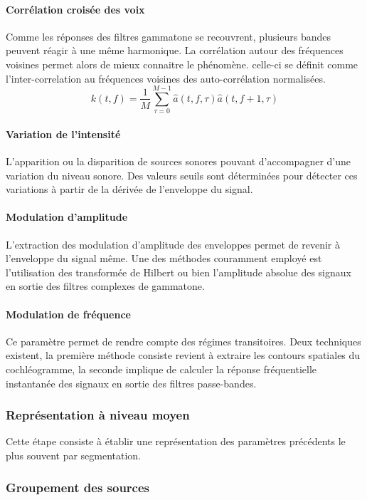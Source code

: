 \paragraph{Corrélation croisée des voix}
Comme les réponses des filtres gammatone se recouvrent, plusieurs bandes peuvent réagir à une même harmonique. La corrélation autour des fréquences voisines permet alors de mieux connaitre le phénomène. celle-ci se définit comme l'inter-correlation au fréquences voisines des auto-corrélation normalisées. 
\begin{equation}
k(t,f) = \frac{1}{M}\sum_{\tau=0}^{M-1}\hat{a}(t,f,\tau) \hat{a}(t,f+1,\tau)
\end{equation}
\paragraph{Variation de l'intensité}
L'apparition ou la disparition de sources sonores pouvant d'accompagner d'une variation du niveau sonore. Des valeurs seuils sont déterminées pour détecter ces variations à partir de la dérivée de l'enveloppe du signal.

\paragraph{Modulation d'amplitude}
L'extraction des modulation d'amplitude des enveloppes permet de revenir à l'enveloppe du signal même. Une des méthodes couramment employé est l'utilisation des transformée de Hilbert ou bien l'amplitude absolue des signaux en sortie des filtres complexes de gammatone.

\paragraph{Modulation de fréquence}
Ce paramètre permet de rendre compte des régimes transitoires.  Deux techniques existent, la première méthode consiste revient à extraire les contours spatiales du cochléogramme, la seconde implique de calculer la réponse fréquentielle instantanée des signaux en sortie des filtres passe-bandes. 

\subsubsection{Représentation à niveau moyen}
Cette étape consiste à établir une représentation des paramètres précédents le plus souvent par segmentation. 
\subsubsection{Groupement des sources}\label{sec:groupement}


